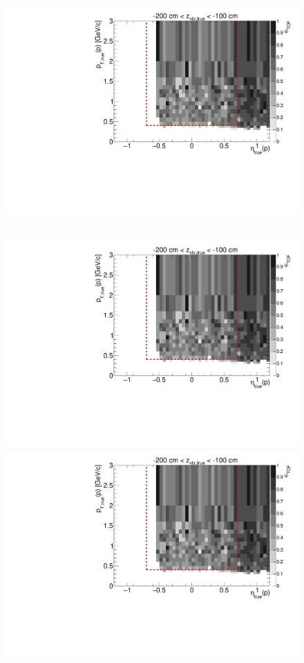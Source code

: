 \begin{figure}[hb]
{  \includegraphics[width=\linewidth,page=17]{graphics/eff/Eff2D_TOF_proton_Plus.pdf}
}~
\parbox{0.495\textwidth}{
  \centering
  \includegraphics[width=\linewidth,page=12]{graphics/eff/Eff2D_TOF_proton_Plus.pdf}\\
  \includegraphics[width=\linewidth,page=14]{graphics/eff/Eff2D_TOF_proton_Plus.pdf}\\
}
\end{figure}
